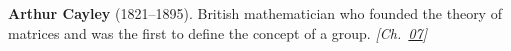 \textbf{Arthur Cayley} (1821–1895). British mathematician who founded the theory of matrices and was the first to define the concept of a group. \emph{[Ch.~\hyperref[ch:billiardsconicsporism]{07}]}

